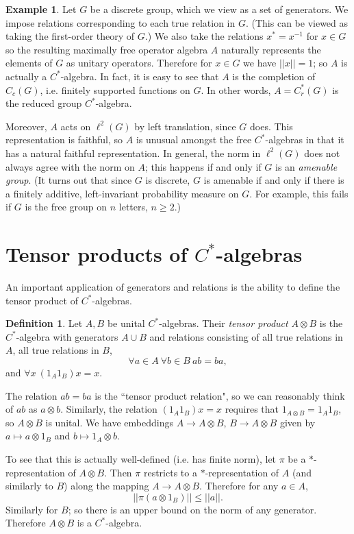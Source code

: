 \documentclass[12pt]{report}
\newcommand{\dfn}[1]{\emph{#1}\index{#1}}
\theoremstyle{definition}
\newtheorem{definition}[theorem]{Definition}
\newtheorem{example}[theorem]{Example}
\begin{document}
\begin{example}
Let $G$ be a discrete group, which we view as a set of generators. We impose relations corresponding to each true relation in $G$. (This can be viewed as taking the first-order theory of $G$.) We also take the relations $x^* = x^{-1}$ for $x \in G$ so the resulting maximally free operator algebra $A$ naturally represents the elements of $G$ as unitary operators. Therefore for $x \in G$ we have $||x|| = 1$; so $A$ is actually a $C^*$-algebra. In fact, it is easy to see that $A$ is the completion of $C_c(G)$, i.e. finitely supported functions on $G$. In other words, $A = C^*_r(G)$ is the reduced group $C^*$-algebra.

Moreover, $A$ acts on $\ell^2(G)$ by left translation, since $G$ does. This representation is faithful, so $A$ is unusual amongst the free $C^*$-algebras in that it has a natural faithful representation. In general, the norm in $\ell^2(G)$ does not always agree with the norm on $A$; this happens if and only if $G$ is an \dfn{amenable group}. (It turns out that since $G$ is discrete, $G$ is amenable if and only if there is a finitely additive, left-invariant probability measure on $G$. For example, this fails if $G$ is the free group on $n$ letters, $n \geq 2$.)
\end{example}

\section{Tensor products of $C^*$-algebras}
An important application of generators and relations is the ability to define the tensor product of $C^*$-algebras.
\begin{definition}
    Let $A,B$ be unital $C^*$-algebras. Their \dfn{tensor product} $A \otimes B$ is the $C^*$-algebra with generators $A \cup B$ and relations consisting of all true relations in $A$, all true relations in $B$,
    $$\forall a\in A~\forall b\in B~ab = ba,$$
    and $\forall x ~(1_A1_B)x = x$.
\end{definition}
The relation $ab = ba$ is the ``tensor product relation", so we can reasonably think of $ab$ as $a \otimes b$. Similarly, the relation $(1_A1_B)x = x$ requires that $1_{A \otimes B} = 1_A1_B$, so $A \otimes B$ is unital. We have embeddings $A \to A \otimes B$, $B \to A \otimes B$ given by $a \mapsto a \otimes 1_B$ and $b \mapsto 1_A \otimes b$.

To see that this is actually well-defined (i.e. has finite norm), let $\pi$ be a $*$-representation of $A \otimes B$. Then $\pi$ restricts to a $*$-representation of $A$ (and similarly to $B$) along the mapping $A \to A \otimes B$. Therefore for any $a \in A$,
$$||\pi(a \otimes 1_B)|| \leq ||a||.$$
Similarly for $B$; so there is an upper bound on the norm of any generator. Therefore $A \otimes B$ is a $C^*$-algebra.
\end{document}
